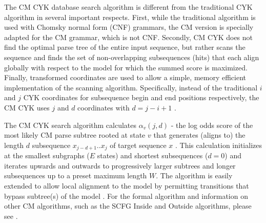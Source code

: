 \documentclass[11pt]{article}
\begin{document}
The CM CYK database search algorithm is different from the traditional
CYK algorithm \cite{Kasami65, Younger67, HopcroftUllman79} in several
important respects. First, while the traditional algorithm is used with
Chomsky normal form (CNF) grammars, the CM version is specially adapted
for the CM grammar, which is not CNF\@. Secondly, CM CYK does not find
the optimal parse tree of the entire input sequence, but
rather scans the sequence and finds the set of
non-overlapping subsequences (hits) that each align globally with
respect to the model for which the summed score is maximized. Finally, 
transformed coordinates are used to allow a simple, memory efficient
implementation of the scanning algorithm. Specifically, instead of the
traditional $i$ and $j$ CYK coordinates for subsequence begin and end
positions respectively, the CM CYK uses $j$ and $d$ coordinates with
$d = j-i+1$ \cite{Durbin98}.

The CM CYK search algorithm calculates $\alpha_v(j,d)$ - the log odds score
of the most likely CM parse subtree rooted at state $v$ that generates
(aligns to) the length $d$ subsequence $x_{j-d+1}..x_j$ of target sequence
$x$ \cite{Durbin98}. This calculation initializes at the smallest
subgraphs ($E$ states) and shortest subsequences ($d=0$) and iterates
upwards and outwards to progressively larger subtrees and longer
subsequences up to a preset maximum length $W$. 
The algorithm is easily extended to allow local alignment to the model
by permitting transitions that bypass subtree(s) of the model
\cite{KleinEddy03}. For the formal algorithm and information on other
CM algorithms, such as the SCFG Inside and Outside algorithms, please
see \cite{Durbin98}.
 
\end{document}
